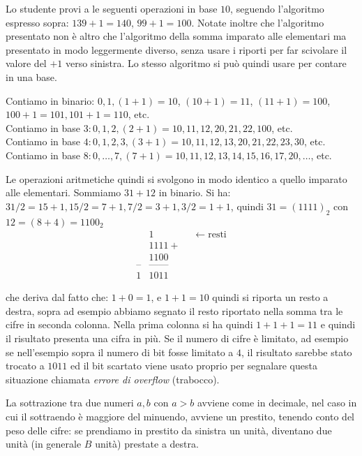 Lo studente provi a le seguenti operazioni in base $10$, seguendo l'algoritmo
espresso sopra: $139+1 = 140$, $99+1 = 100$. Notate inoltre che l'algoritmo presentato non è altro che l'algoritmo della somma imparato alle elementari ma presentato in modo leggermente diverso, senza usare i riporti per far scivolare
il valore del $+1$ verso sinistra. Lo stesso algoritmo si può quindi usare per contare in una base.
\begin{ex}\label{ex:somma}
Contiamo in binario: $0, 1, (1+1) = 10$, $(10+1) = 11$, $(11+1) = 100$,
$100+1 = 101, 101+1 = 110$, etc.\\
Contiamo in base $3: 0,1,2,(2+1)=10,11,12,20,21,22,100$, etc.\\
Contiamo in base $4: 0,1,2,3, (3+1) = 10, 11,12,13,20,21,22,23,30$, etc.\\
Contiamo in base $8: 0,\ldots,7, (7+1)=10,11,12,13,14,15,16,17,20,\ldots$, etc.

Le operazioni aritmetiche quindi si svolgono in modo identico a quello imparato
alle elementari. Sommiamo $31+12$ in binario. Si ha: $31/2 = 15 + 1, 15/2 = 7 + 1, 7/2 = 3 + 1, 3 /2 = 1 + 1$, quindi $31 = (1111)_2$ con $12 = (8+4) = 1100_2$
\begin{align*}
    &1\qquad \qquad \leftarrow\text{resti}\\
	&1111+\\[-0.5ex]
	&1100\\[-2ex]
   \text{--}&\text{------}\\[-1.8ex]
   1&1011
\end{align*}
\end{ex}

che deriva dal fatto che: $1+0 = 1$, e $1+1 = 10$ quindi si riporta un resto
a destra, sopra ad esempio abbiamo segnato il resto riportato nella somma tra le cifre in seconda colonna. Nella prima colonna si ha quindi $1+1+1 = 11$ e quindi il risultato presenta una cifra in più.
Se il numero di cifre è limitato, ad esempio se nell'esempio sopra il numero di bit fosse limitato a $4$, il risultato sarebbe stato trocato a $1011$ ed il
bit scartato viene usato proprio per segnalare questa situazione chiamata \emph{errore di overflow} (trabocco).

La sottrazione tra due numeri $a,b$ con $a>b$ avviene come in decimale, nel caso in cui il sottraendo è maggiore del minuendo, avviene un prestito, tenendo conto del peso delle cifre: se prendiamo in prestito da sinistra un unità, diventano due unità (in generale $B$ unità) prestate a destra.

